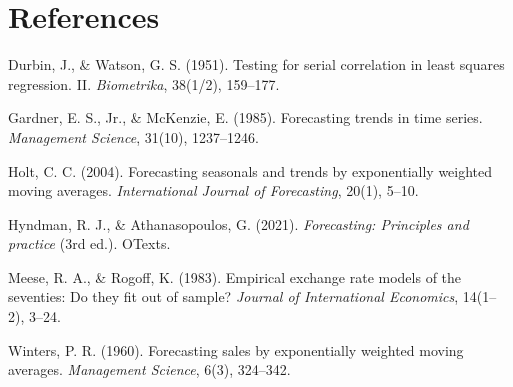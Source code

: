 \documentclass[11pt,a4paper]{article}
\begin{document}
\section*{References}
{\small
\setlength{\parskip}{2pt}
\hangindent=1.27cm Durbin, J., \& Watson, G. S. (1951). Testing for serial correlation in least squares regression. II.
\textit{Biometrika}, 38(1/2), 159--177.\par
\hangindent=1.27cm Gardner, E. S., Jr., \& McKenzie, E. (1985). Forecasting trends in time series. \textit{Management Science},
31(10), 1237--1246.\par
\hangindent=1.27cm Holt, C. C. (2004). Forecasting seasonals and trends by exponentially weighted moving averages.
\textit{International Journal of Forecasting}, 20(1), 5--10.\par
\hangindent=1.27cm Hyndman, R. J., \& Athanasopoulos, G. (2021). \textit{Forecasting: Principles and practice} (3rd ed.). OTexts.\par
\hangindent=1.27cm Meese, R. A., \& Rogoff, K. (1983). Empirical exchange rate models of the seventies: Do they fit out of sample?
\textit{Journal of International Economics}, 14(1--2), 3--24.\par
\hangindent=1.27cm Winters, P. R. (1960). Forecasting sales by exponentially weighted moving averages. \textit{Management
Science}, 6(3), 324--342.\par
}
\end{document}
